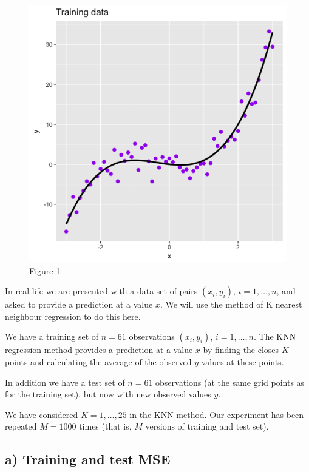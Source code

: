 \documentclass[]{article}
\begin{document}
\begin{figure}
\centering
\includegraphics{Prob1f1.png}
\caption{Figure 1}
\end{figure}

In real life we are presented with a data set of pairs \((x_i,y_i)\),
\(i=1,\ldots,n\), and asked to provide a prediction at a value \(x\). We
will use the method of K nearest neighbour regression to do this here.

We have a training set of \(n=61\) observations \((x_i,y_i)\),
\(i=1,\ldots,n\). The KNN regression method provides a prediction at a
value \(x\) by finding the closes \(K\) points and calculating the
average of the observed \(y\) values at these points.

In addition we have a test set of \(n=61\) observations (at the same
grid points as for the training set), but now with new observed values
\(y\).

We have considered \(K=1,\ldots,25\) in the KNN method. Our experiment
has been repeated \(M=1000\) times (that is, \(M\) versions of training
and test set).

\subsection{a) Training and test MSE}\label{a-training-and-test-mse}
\end{document}

